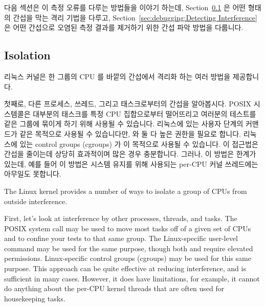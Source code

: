 다음 섹션은 이 측정 오류를 다루는 방법들을 이야기 하는데,
Section~\ref{sec:debugging:Isolation}
은 어떤 형태의 간섭을 막는 격리 기법을 다루고,
Section~\ref{sec:debugging:Detecting Interference}
은 어떤 간섭으로 오염된 측정 결과를 제거하기 위한 간섭 파악 방법을 다룹니다.

\subsection{Isolation}
\label{sec:debugging:Isolation}

리눅스 커널은 한 그룹의 CPU 를 바깥의 간섭에서 격리화 하는 여러 방법을
제공합니다.

첫째로, 다른 프로세스, 쓰레드, 그리고 태스크로부터의 간섭을 알아봅시다.
POSIX  시스템콜은 대부분의 태스크를 특정 CPU
집합으로부터 떨어뜨리고 여러분의 테스트를 같은 그룹에 묶이게 하기 위해 사용될
수 있습니다.
리눅스에 있는 사용자 단계의  커맨드가 같은 목적으로 사용될 수
있습니다만,  와  둘 다 높은 권한을 필요로
합니다.
리눅스에 있는 control groups (cgroups) 가 이 목적으로 사용될 수 있습니다.
이 접근법은 간섭을 줄이는데 상당히 효과적이며 많은 경우 충분합니다.
그러나, 이 방법은 한계가 있는데, 예를 들어 이 방법은 시스템 유지를 위해
사용되는 per-CPU 커널 쓰레드에는 아무일도 못합니다.

\iffalse

The Linux kernel provides a number of ways to isolate a group of
CPUs from outside interference.

First, let's look at interference by other processes, threads, and tasks.
The POSIX  system call may be used to move
most tasks off of a given set of CPUs and to confine your tests to
that same group.
The Linux-specific user-level  command may be used for
the same purpose, though both  and
 require elevated permissions.
Linux-specific control groups (cgroups) may be used for this same purpose.
This approach can be quite effective at reducing interference, and
is sufficient in many cases.
However, it does have limitations, for example, it cannot do anything
about the per-CPU kernel threads that are often used for housekeeping
tasks.

